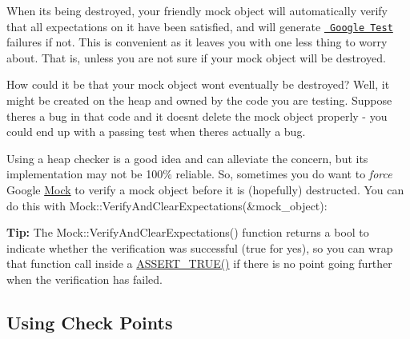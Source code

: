 When it\textquotesingle{}s being destroyed, your friendly mock object will automatically verify that all expectations on it have been satisfied, and will generate \href{../../googletest/}{\texttt{ Google Test}} failures if not. This is convenient as it leaves you with one less thing to worry about. That is, unless you are not sure if your mock object will be destroyed.

How could it be that your mock object won\textquotesingle{}t eventually be destroyed? Well, it might be created on the heap and owned by the code you are testing. Suppose there\textquotesingle{}s a bug in that code and it doesn\textquotesingle{}t delete the mock object properly -\/ you could end up with a passing test when there\textquotesingle{}s actually a bug.

Using a heap checker is a good idea and can alleviate the concern, but its implementation may not be 100\% reliable. So, sometimes you do want to {\itshape force} Google \mbox{\hyperlink{classMock}{Mock}} to verify a mock object before it is (hopefully) destructed. You can do this with {\ttfamily Mock\+::\+Verify\+And\+Clear\+Expectations(\&mock\+\_\+object)}\+:


\begin{DoxyCode}{0}
\DoxyCodeLine{}
\DoxyCodeLine{}
\DoxyCodeLine{}
\end{DoxyCode}


{\bfseries{Tip\+:}} The {\ttfamily Mock\+::\+Verify\+And\+Clear\+Expectations()} function returns a {\ttfamily bool} to indicate whether the verification was successful ({\ttfamily true} for yes), so you can wrap that function call inside a {\ttfamily \mbox{\hyperlink{gtest_8h_ae9244bfbda562e8b798789b001993fa5}{A\+S\+S\+E\+R\+T\+\_\+\+T\+R\+U\+E()}}} if there is no point going further when the verification has failed.

\subsection*{Using Check Points}

